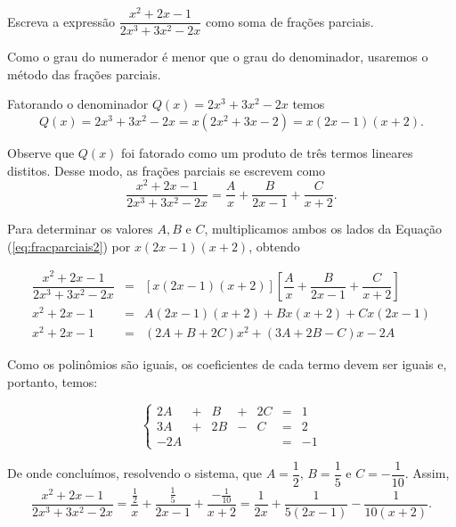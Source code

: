\begin{exem}
    Escreva a expressão $\dfrac{x^2 + 2x - 1}{2x^3 + 3x^2 - 2x}$ como soma de frações parciais.

    Como o grau do numerador é menor que o grau do denominador, usaremos o método das frações parciais.

    Fatorando o denominador $Q(x) = 2x^3 + 3x^2 - 2x$ temos $$Q(x) = 2x^3 + 3x^2 - 2x = x(2x^2 + 3x - 2) = x(2x-1)(x+2).$$

    Observe que $Q(x)$ foi fatorado como um produto de três termos lineares distitos. Desse modo, as frações parciais se escrevem como 
    \begin{equation}
    \label{eq:fracparciais2}
    \dfrac{x^2 + 2x - 1}{2x^3 + 3x^2 - 2x} = \dfrac{A}{x} + \dfrac{B}{2x-1} + \dfrac{C}{x+2}.
    \end{equation}

    Para determinar os valores $A, B$ e $C$, multiplicamos ambos os lados da Equação (\ref{eq:fracparciais2}) por $x(2x-1)(x+2)$, obtendo

    \begin{eqnarray*}
    [x(2x-1)(x+2)]\dfrac{x^2 + 2x - 1}{2x^3 + 3x^2 - 2x} & = & [x(2x-1)(x+2)] \left[\dfrac{A}{x} + \dfrac{B}{2x-1}+\dfrac{C}{x+2}\right]\\[5pt]
    x^2 + 2x - 1 & =& A(2x-1)(x+2) + Bx(x+2) + Cx(2x-1) \\[5pt]
    x^2 + 2x - 1 & =& (2A + B + 2C)x^2 + (3A + 2B - C)x -2A
    \end{eqnarray*}

    Como os polinômios são iguais, os coeficientes de cada termo devem ser iguais e, portanto, temos:

    \begin{equation*}
    \left\{ \begin{array}{ccccccc} 2A & + & B & + & 2C &=& 1 \\[5pt]
    3A & + & 2B & - & C &=& 2\\[5pt]
    -2A &  &  & &  &=& -1
    \end{array}
    \right.    
    \end{equation*}

    De onde concluímos, resolvendo o sistema, que $A = \dfrac{1}{2}, \, B = \dfrac{1}{5}$ e $C = -\dfrac{1}{10}$. Assim, $$\dfrac{x^2 + 2x - 1}{2x^3 + 3x^2 - 2x} = \dfrac{\frac{1}{2}}{x} + \dfrac{\frac{1}{5}}{2x-1}+\dfrac{-\frac{1}{10}}{x+2} = \dfrac{1}{2x} + \dfrac{1}{5(2x-1)} - \dfrac{1}{10(x+2)}.$$
 
\end{exem}

